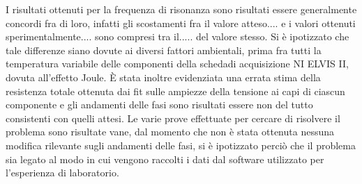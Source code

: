 I risultati ottenuti per la frequenza di risonanza sono risultati essere generalmente concordi fra di loro, infatti gli scostamenti fra il valore atteso.... e i valori ottenuti sperimentalmente.... sono compresi tra il..... del valore stesso.
Si è ipotizzato che tale differenze siano dovute ai diversi fattori ambientali, prima fra tutti la  temperatura variabile delle componenti della schedadi acquisizione NI ELVIS II, dovuta all’effetto Joule.
È stata inoltre evidenziata una errata stima della resistenza totale ottenuta dai fit sulle ampiezze della tensione ai capi di ciascun componente e gli andamenti delle fasi sono risultati essere non del tutto consistenti con quelli attesi.
Le varie prove effettuate per cercare di risolvere il problema sono risultate vane, dal momento che non è stata ottenuta nessuna modifica rilevante sugli andamenti delle fasi, si è ipotizzato perciò che il problema sia legato al modo in cui vengono raccolti i dati dal software utilizzato per l’esperienza di laboratorio.
